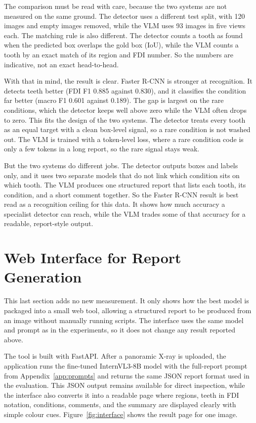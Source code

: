 \documentclass[a4paper,12pt]{report}
\begin{document}
The comparison must be read with care, because the two systems are not measured on the same ground. The detector uses a different test split, with 120 images and empty images removed, while the VLM uses 93 images in five views each. The matching rule is also different. The detector counts a tooth as found when the predicted box overlaps the gold box (IoU), while the VLM counts a tooth by an exact match of its region and FDI number. So the numbers are indicative, not an exact head-to-head.

With that in mind, the result is clear. Faster R-CNN is stronger at recognition. It detects teeth better (FDI F1 0.885 against 0.830), and it classifies the condition far better (macro F1 0.601 against 0.189). The gap is largest on the rare conditions, which the detector keeps well above zero while the VLM often drops to zero. This fits the design of the two systems. The detector treats every tooth as an equal target with a clean box-level signal, so a rare condition is not washed out. The VLM is trained with a token-level loss, where a rare condition code is only a few tokens in a long report, so the rare signal stays weak.

But the two systems do different jobs. The detector outputs boxes and labels only, and it uses two separate models that do not link which condition sits on which tooth. The VLM produces one structured report that lists each tooth, its condition, and a short comment together. So the Faster R-CNN result is best read as a recognition ceiling for this data. It shows how much accuracy a specialist detector can reach, while the VLM trades some of that accuracy for a readable, report-style output.
\newpage
\section{Web Interface for Report Generation}
\label{sec:interface}

This last section adds no new measurement. It only shows how the best model is packaged into a small web tool, allowing a structured report to be produced from an image without manually running scripts. The interface uses the same model and prompt as in the experiments, so it does not change any result reported above.

The tool is built with FastAPI. After a panoramic X-ray is uploaded, the application runs the fine-tuned InternVL3-8B model with the full-report prompt from Appendix~\ref{app:prompts} and returns the same JSON report format used in the evaluation. This JSON output remains available for direct inspection, while the interface also converts it into a readable page where regions, teeth in FDI notation, conditions, comments, and the summary are displayed clearly with simple colour cues. Figure~\ref{fig:interface} shows the result page for one image.
\end{document}
